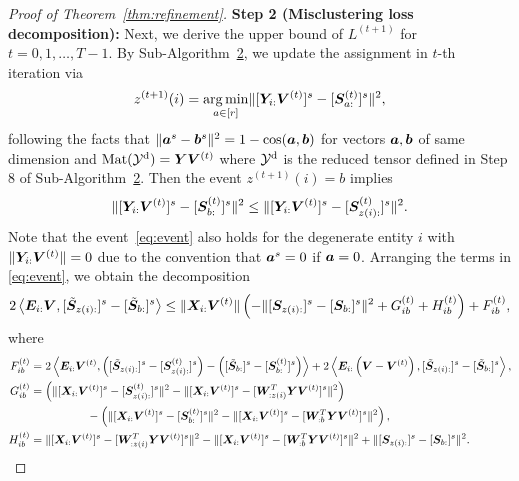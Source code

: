 \documentclass[lettersize,onecolumn,journal]{IEEEtran}
\theoremstyle{definition}
\theoremstyle{definition}
\newcommand{\of}[1]{\left(#1\right)}
\newcommand{\off}[1]{\left[#1\right]}
\newcommand{\ang}[1]{\left\langle#1\right\rangle}
\begin{document}
\begin{proof}[Proof of Theorem~\ref{thm:refinement}]
{\bf Step 2 (Misclustering loss decomposition):} Next, we derive the upper bound of $L^{(t+1)}$ for $t = 0 ,1, \ldots, T-1$. By Sub-Algorithm~\hyperref[alg:main]{2}, we update the assignment in $t$-th iteration via
    \begin{equation}
        z^{(t+1)}(i) = \operatorname*{arg\,min}_{a \in [r]} \lVert [ \bm Y_{i:} \bm{V}^{(t)}  ]^s - [\bm S_{a:}^{(t)}]^s \rVert^2,
    \end{equation}
    following the facts that $\lVert\bm{a}^s - \bm{b}^s\rVert^2 = 1 - \cos(\bm{a}, \bm{b})$ for vectors $\bm{a},\bm{b}$ of same dimension and $\text{Mat}(\mathcal{Y}^\text{d}) = \bm Y \bm{V}^{(t)}$ where $\mathcal{Y}^\text{d}$ is the reduced tensor defined in Step 8 of Sub-Algorithm~\hyperref[alg:main]{2}. Then the event $z^{(t+1)}(i) = b$ implies
    \begin{equation}\label{eq:event}
        \onormSize{}{ [ \mY_{i:} \mV^{(t)}  ]^s - [\mS_{b:}^{(t)}]^s }^2 \leq \onormSize{}{ [ \mY_{i:} \mV^{(t)}  ]^s - [\mS_{z(i):}^{(t)}]^s }^2.
    \end{equation}
    {\color{blue} Note that the event~\eqref{eq:event} also holds for the degenerate entity $i$ with $\lVert\bm Y_{i:} \bm{V}^{(t)}\rVert = 0$ due to the convention that $\bm{a}^s = 0$ if $\bm{a} = 0$. }
    Arranging the terms in \eqref{eq:event}, we obtain the decomposition
    \begin{equation}\label{eq:decomp}
        2 \ang{ \mE_{i:} \mV, [  \tilde \mS_{z(i):} ]^s - [  \tilde \mS_{b:} ]^s } \leq \onormSize{}{\mX_{i:} \mV^{(t)}} \of{ - \onormSize{}{ [ \mS_{z(i):}  ]^s - [ \mS_{b:}  ]^s  }^2 + G_{ib}^{(t)} + H_{ib}^{(t)} } +  F_{ib}^{(t)},
    \end{equation}
    where
    \begin{align}
        F_{ib}^{(t)} &= 2 \ang{\mE_{i:} \mV^{(t)}, \of{ [  \tilde \mS_{z(i):} ]^s  -  [  \mS_{z(i):}^{(t)} ]^s  }  - \of{  [  \tilde \mS_{b:} ]^s  -  [  \mS_{b:}^{(t)} ]^s  }  }  + 2 \ang{ \mE_{i:} \of{ \mV - \mV^{(t)} }, [  \tilde \mS_{z(i):} ]^s - [  \tilde \mS_{b:} ]^s  }, \label{eq:f}\\
        G_{ib}^{(t)} &=   \of{ \onormSize{}{ [\mX_{i:} \mV^{(t)}]^s -  [  \mS_{z(i):}^{(t)}  ]^s}^2 -  \onormSize{}{ [\mX_{i:} \mV^{(t)}]^s -  [  \mW_{:z(i)}^T \mY \mV^{(t)} ]^s}^2}   \\
        & \quad \quad \quad \quad \quad -   \of{ \onormSize{}{ [\mX_{i:} \mV^{(t)}]^s -  [  \mS_{b:}^{(t)}  ]^s}^2 -  \onormSize{}{ [\mX_{i:} \mV^{(t)}]^s -  [  \mW_{:b}^T \mY \mV^{(t)} ]^s}^2 }, \label{eq:g} \\
        H_{ib}^{(t)} &=   \onormSize{}{ [\mX_{i:} \mV^{(t)}]^s -  [  \mW_{:z(i)}^T \mY \mV^{(t)} ]^s}^2 - \onormSize{}{ [\mX_{i:} \mV^{(t)}]^s -  [  \mW_{:b}^T \mY \mV^{(t)} ]^s}^2  + \onormSize{}{ [ \mS_{z(i):}  ]^s - [ \mS_{b:}  ]^s  }^2 . \label{eq:h}
    \end{align}
    

\end{proof}
\end{document}
